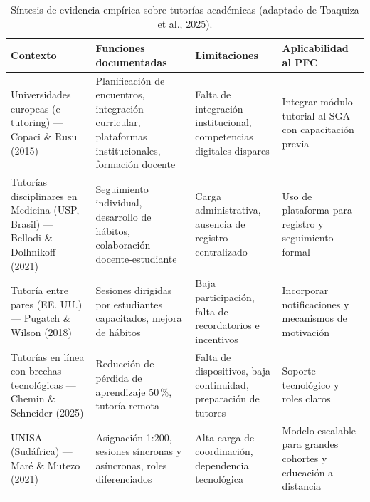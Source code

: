 \documentclass[11pt,a4paper]{article}
\begin{document}
\begin{table}[htbp]
\centering
\caption{S\'intesis de evidencia emp\'irica sobre tutor\'ias acad\'emicas (adaptado de Toaquiza et al., 2025).}
\label{tab:sintesisempirica}
\begin{tabularx}{\textwidth}{L{3.2cm}L{4.5cm}L{4cm}X}
\toprule
{}
\textbf{Contexto} & \textbf{Funciones documentadas} & \textbf{Limitaciones} & \textbf{Aplicabilidad al PFC}\\
\midrule
Universidades europeas (e-tutoring) --- Copaci \& Rusu (2015) & Planificaci\'on de encuentros, integraci\'on curricular, plataformas institucionales, formaci\'on docente & Falta de integraci\'on institucional, competencias digitales dispares & Integrar m\'odulo tutorial al SGA con capacitaci\'on previa\\
\midrule
Tutor\'ias disciplinares en Medicina (USP, Brasil) --- Bellodi \& Dolhnikoff (2021) & Seguimiento individual, desarrollo de h\'abitos, colaboraci\'on docente-estudiante & Carga administrativa, ausencia de registro centralizado & Uso de plataforma para registro y seguimiento formal\\
\midrule
Tutor\'ia entre pares (EE. UU.) --- Pugatch \& Wilson (2018) & Sesiones dirigidas por estudiantes capacitados, mejora de h\'abitos & Baja participaci\'on, falta de recordatorios e incentivos & Incorporar notificaciones y mecanismos de motivaci\'on\\
\midrule
Tutor\'ias en l\'inea con brechas tecnol\'ogicas --- Chemin \& Schneider (2025) & Reducci\'on de p\'erdida de aprendizaje 50\,\%, tutor\'ia remota & Falta de dispositivos, baja continuidad, preparaci\'on de tutores & Soporte tecnol\'ogico y roles claros\\
\midrule
UNISA (Sud\'africa) --- Mar\'e \& Mutezo (2021) & Asignaci\'on 1:200, sesiones s\'incronas y as\'incronas, roles diferenciados & Alta carga de coordinaci\'on, dependencia tecnol\'ogica & Modelo escalable para grandes cohortes y educaci\'on a distancia\\
\bottomrule
\end{tabularx}
\end{table}

\vspace{0.7cm}
\end{document}
